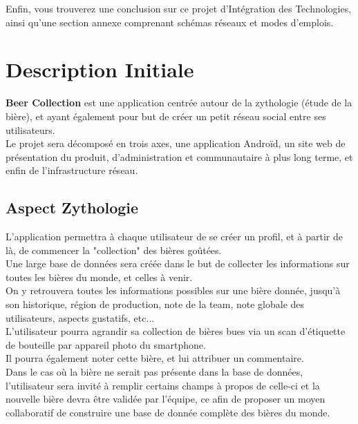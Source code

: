 \documentclass{report}
\begin{document}
	 Enfin, vous trouverez une conclusion sur ce projet d'Intégration des Technologies, ainsi qu'une section annexe comprenant schémas réseaux et modes d'emplois.\\

	
\chapter{Description Initiale} %

	\textbf{Beer Collection} est une application centrée autour de la zythologie (étude de la bière), et ayant également pour but de créer un petit réseau social entre ses utilisateurs.\\

	Le projet sera décomposé en trois axes, une application Androïd, un site web de présentation du produit, d'administration et communautaire à plus long terme, et enfin de l'infrastructure réseau.\\

	\section{Aspect Zythologie}

		L'application permettra à chaque utilisateur de se créer un profil, et à partir de là, de commencer la "collection" des bières goûtées.\\

		Une large base de données sera créée dans le but de collecter les informations sur toutes les bières du monde, et celles à venir.\\
		On y retrouvera toutes les informations possibles sur une bière donnée, jusqu'à son historique, région de production, note de la team, note globale des utilisateurs, aspects gustatifs, etc...\\

		L'utilisateur pourra agrandir sa collection de bières bues via un scan d'étiquette de bouteille par appareil photo du smartphone.\\
		Il pourra également noter cette bière, et lui attribuer un commentaire.\\

		Dans le cas où la bière ne serait pas présente dans la base de données, l'utilisateur sera invité à remplir certains champs à propos de celle-ci et la nouvelle bière devra être validée par l'équipe, ce afin de proposer un moyen collaboratif de construire une base de donnée complète des bières du monde.\\
\end{document}
